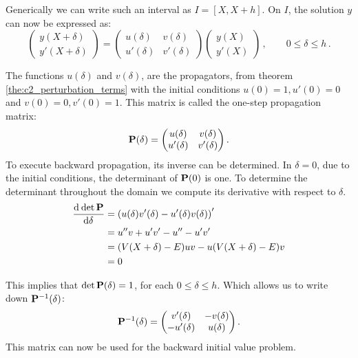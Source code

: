 Generically we can write such an interval as $I = [X, X+h]$. On $I$, the solution $y$ can now be expressed as:
\begin{equation}
    \begin{pmatrix}y(X+\delta) \\ y'(X+\delta)\end{pmatrix}
    = \begin{pmatrix} u(\delta) & v(\delta) \\ u'(\delta) & v'(\delta) \end{pmatrix} \begin{pmatrix} y(X) \\ y'(X) \end{pmatrix} \,, \qquad %
    0 \leq \delta \leq h \,. \label{equ:c2_cpm_propmatrix}
\end{equation}

The functions $u(\delta)$ and $v(\delta)$, are the propagators, from theorem \ref{the:c2_perturbation_terms} with the initial conditions $u(0) = 1, u'(0)=0$ and
$v(0) = 0, v'(0)=1$. This matrix is called the one-step propagation matrix:
$$
    \vb{P}(\delta) = \begin{pmatrix} u(\delta) & v(\delta) \\ u'(\delta) & v'(\delta) \end{pmatrix}\text{.}
$$
To execute backward propagation, its inverse can be determined. In $\delta = 0$, due to the initial conditions, the determinant of $\vb{P}(0)$ is one. To determine the determinant throughout the domain we compute its derivative with respect to $\delta$.
\begin{align*}
    \dv[]{\det\vb{P}}{\delta} & = \left(u(\delta) v'(\delta) - u'(\delta) v(\delta)\right)' \\
                              & = u'' v + u'v' - u'' - u'v'                                 \\
                              & =(V(X+\delta) - E) u v - u (V(X+\delta) - E) v              \\
                              & =0
\end{align*}

This implies that $\det\vb{P}(\delta) = 1$, for each $0\leq \delta\leq h$. Which allows us to write down $\vb{P}^{-1}(\delta)$:
$$
    \vb{P}^{-1}(\delta) = \begin{pmatrix} v'(\delta) & -v(\delta) \\ -u'(\delta) & u(\delta) \end{pmatrix}\text{.}
$$
This matrix can now be used for the backward initial value problem.

